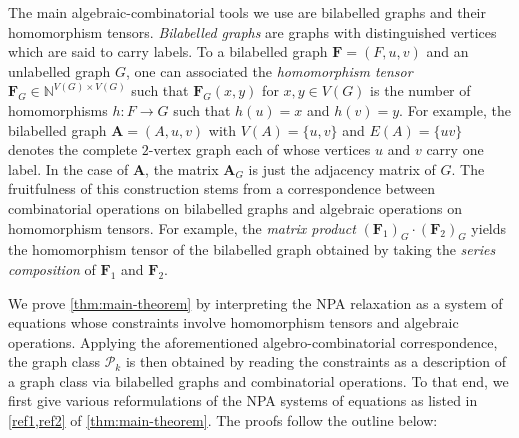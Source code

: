 \documentclass[a4paper,onecolumn,11pt,accepted=2026-01-06]{quantumarticle}
\theoremstyle{plain}
\theoremstyle{remark}
\theoremstyle{definition}
\begin{document}
The main algebraic-combinatorial tools we use are bilabelled graphs and their homomorphism tensors. \emph{Bilabelled graphs} are graphs with distinguished vertices which are said to carry labels. To a bilabelled graph $\boldsymbol{F} = (F, u, v)$ and an unlabelled graph $G$, one can associated the \emph{homomorphism tensor} $\boldsymbol{F}_G \in \mathbb{N}^{V(G) \times V(G)}$ such that $\boldsymbol{F}_G(x, y)$ for $x,y \in V(G)$ is the number of homomorphisms $h \colon F \to G$ such that $h(u) = x$ and $h(v) = y$.
For example, the bilabelled graph $\boldsymbol{A} = (A, u, v)$ with $V(A) = \{u,v\}$ and $E(A) = \{uv\}$ denotes the complete $2$-vertex graph each of whose vertices $u$ and $v$ carry one label.
In the case of $\boldsymbol{A}$, the matrix $\boldsymbol{A}_G$ is just the adjacency matrix of $G$.
The fruitfulness of this construction stems from a correspondence between combinatorial operations on bilabelled graphs and algebraic operations on homomorphism tensors.
For example, the \emph{matrix product} $(\boldsymbol{F}_1)_G \cdot (\boldsymbol{F}_2)_G$ yields the homomorphism tensor of the bilabelled graph obtained by taking the \emph{series composition} of $\boldsymbol{F}_1$ and $\boldsymbol{F}_2$.

We prove \cref{thm:main-theorem} by interpreting the NPA relaxation as a system of equations whose constraints involve homomorphism tensors and algebraic operations.
Applying the aforementioned algebro-combinatorial correspondence,
the graph class $\mathcal{P}_k$ is then obtained by reading the constraints as a description of a graph class via bilabelled graphs and combinatorial operations.
To that end, we first give various reformulations of the NPA systems of equations as listed in \cref{ref1,ref2} of \cref{thm:main-theorem}.
The proofs follow the outline below:%
\end{document}
